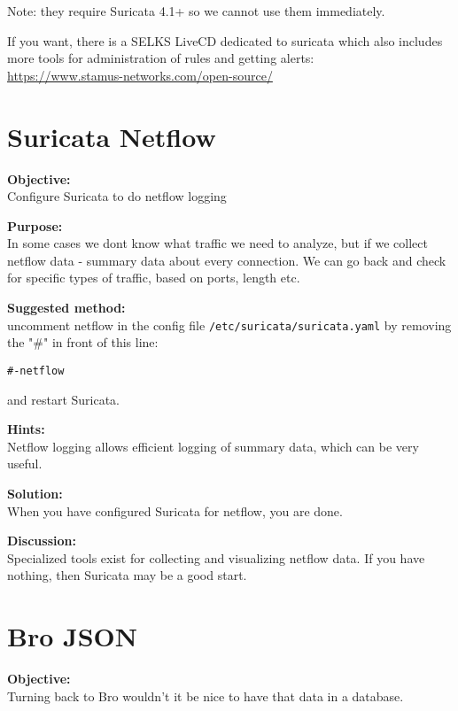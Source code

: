 \documentclass[a4paper,11pt,notitlepage]{report}
\begin{document}
Note: they require Suricata 4.1+ so we cannot use them immediately.

If you want, there is a SELKS LiveCD dedicated to suricata which also includes more tools for administration of rules and getting alerts:\\
\url{https://www.stamus-networks.com/open-source/}

\chapter{Suricata Netflow}
\label{ex:suricatanetflow}


{\bf Objective:} \\
Configure Suricata to do netflow logging


{\bf Purpose:}\\
In some cases we dont know what traffic we need to analyze, but if we collect netflow data - summary data about every connection. We can go back and check for specific types of traffic, based on ports, length etc.


{\bf Suggested method:}\\

uncomment netflow in the config file \verb+/etc/suricata/suricata.yaml+
by removing the "\#" in front of this line:

\begin{alltt}
#- netflow
\end{alltt}

and restart Suricata.


{\bf Hints:}\\
Netflow logging allows efficient logging of summary data, which can be very useful.


{\bf Solution:}\\
When you have configured Suricata for netflow, you are done.


{\bf Discussion:}\\
Specialized tools exist for collecting and visualizing netflow data. If you have nothing, then Suricata may be a good start.



\chapter{Bro JSON}
\label{ex:brojson}


{\bf Objective:} \\
Turning back to Bro wouldn't it be nice to have that data in a database.
\end{document}
